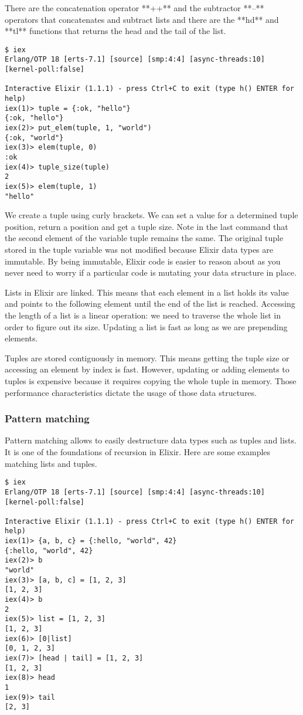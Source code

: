 There are the concatenation operator **++** and the subtractor **--** operators
that concatenates and subtract lists and there are the **hd** and **tl**
functions that returns the head and the tail of the list.

\begin{verbatim}
$ iex
Erlang/OTP 18 [erts-7.1] [source] [smp:4:4] [async-threads:10] [kernel-poll:false]

Interactive Elixir (1.1.1) - press Ctrl+C to exit (type h() ENTER for help)
iex(1)> tuple = {:ok, "hello"}
{:ok, "hello"}
iex(2)> put_elem(tuple, 1, "world")
{:ok, "world"}
iex(3)> elem(tuple, 0)
:ok
iex(4)> tuple_size(tuple)
2
iex(5)> elem(tuple, 1)
"hello"
\end{verbatim}

We create a tuple using curly brackets. We can set a value for a determined
tuple position, return a position and get a tuple size. Note in the last command
that the second element of the variable tuple remains the same. The original
tuple stored in the tuple variable was not modified because Elixir data types
are immutable. By being immutable, Elixir code is easier to reason about as you
never need to worry if a particular code is mutating your data structure in
place.

Lists in Elixir are linked. This means that each element in a list holds its
value and points to the following element until the end of the list is reached.
Accessing the length of a list is a linear operation: we need to traverse the
whole list in order to figure out its size. Updating a list is fast as long as
we are prepending elements.

Tuples are stored contiguously in memory. This means getting the tuple size or
accessing an element by index is fast. However, updating or adding elements to
tuples is expensive because it requires copying the whole tuple in memory. Those
performance characteristics dictate the usage of those data structures.

\subsubsection{Pattern matching}

Pattern matching allows to easily destructure data types such as tuples and
lists. It is one of the foundations of recursion in Elixir. Here are some
examples matching lists and tuples.

\begin{verbatim}
$ iex
Erlang/OTP 18 [erts-7.1] [source] [smp:4:4] [async-threads:10] [kernel-poll:false]

Interactive Elixir (1.1.1) - press Ctrl+C to exit (type h() ENTER for help)
iex(1)> {a, b, c} = {:hello, "world", 42}
{:hello, "world", 42}
iex(2)> b
"world"
iex(3)> [a, b, c] = [1, 2, 3]
[1, 2, 3]
iex(4)> b
2
iex(5)> list = [1, 2, 3]
[1, 2, 3]
iex(6)> [0|list]
[0, 1, 2, 3]
iex(7)> [head | tail] = [1, 2, 3]
[1, 2, 3]
iex(8)> head
1
iex(9)> tail
[2, 3]
\end{verbatim}

